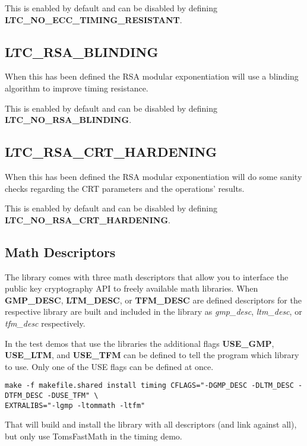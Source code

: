 \documentclass[synpaper]{book}
\begin{document}
This is enabled by default and can be disabled by defining \textbf{LTC\_NO\_ECC\_TIMING\_RESISTANT}.

\subsection{LTC\_RSA\_BLINDING}
When this has been defined the RSA modular exponentiation will use a blinding algorithm to improve timing resistance.

This is enabled by default and can be disabled by defining \textbf{LTC\_NO\_RSA\_BLINDING}.

\subsection{LTC\_RSA\_CRT\_HARDENING}
When this has been defined the RSA modular exponentiation will do some sanity checks regarding the CRT parameters and the operations' results.

This is enabled by default and can be disabled by defining \textbf{LTC\_NO\_RSA\_CRT\_HARDENING}.

\subsection{Math Descriptors}
The library comes with three math descriptors that allow you to interface the public key cryptography API to freely available math
libraries.  When \textbf{GMP\_DESC}, \textbf{LTM\_DESC}, or \textbf{TFM\_DESC} are defined
descriptors for the respective library are built and included in the library as \textit{gmp\_desc}, \textit{ltm\_desc}, or \textit{tfm\_desc} respectively.

In the test demos that use the libraries the additional flags \textbf{USE\_GMP}, \textbf{USE\_LTM}, and \textbf{USE\_TFM} can be defined
to tell the program which library to use.  Only one of the USE flags can be defined at once.

     
\begin{small}
\begin{verbatim}
make -f makefile.shared install timing CFLAGS="-DGMP_DESC -DLTM_DESC -DTFM_DESC -DUSE_TFM" \
EXTRALIBS="-lgmp -ltommath -ltfm"
\end{verbatim}
\end{small}

That will build and install the library with all descriptors (and link against all), but only use TomsFastMath in the timing demo.
\end{document}
